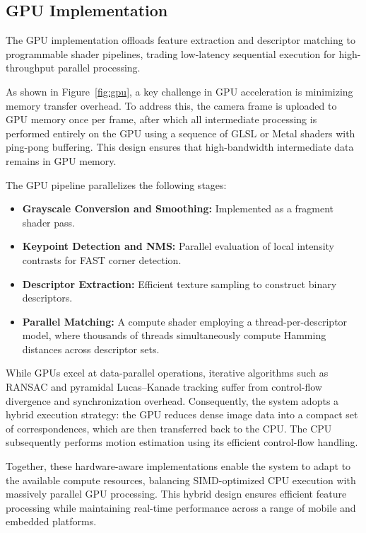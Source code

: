 \subsection{GPU Implementation}



The GPU implementation offloads feature extraction and descriptor matching to programmable shader pipelines, trading low-latency sequential execution for high-throughput parallel processing.

As shown in Figure~\ref{fig:gpu}, a key challenge in GPU acceleration is minimizing memory transfer overhead. To address this, the camera frame is uploaded to GPU memory once per frame, after which all intermediate processing is performed entirely on the GPU using a sequence of GLSL or Metal shaders with ping-pong buffering. This design ensures that high-bandwidth intermediate data remains in GPU memory.

The GPU pipeline parallelizes the following stages:

\begin{itemize}
    \item \textbf{Grayscale Conversion and Smoothing:} Implemented as a fragment shader pass.
    \item \textbf{Keypoint Detection and NMS:} Parallel evaluation of local intensity contrasts for FAST corner detection.
    \item \textbf{Descriptor Extraction:} Efficient texture sampling to construct binary descriptors.
    \item \textbf{Parallel Matching:} A compute shader employing a thread-per-descriptor model, where thousands of threads simultaneously compute Hamming distances across descriptor sets.
\end{itemize}

While GPUs excel at data-parallel operations, iterative algorithms such as RANSAC and pyramidal Lucas--Kanade tracking suffer from control-flow divergence and synchronization overhead. Consequently, the system adopts a hybrid execution strategy: the GPU reduces dense image data into a compact set of correspondences, which are then transferred back to the CPU. The CPU subsequently performs motion estimation using its efficient control-flow handling.

Together, these hardware-aware implementations enable the system to adapt to the available compute resources, balancing SIMD-optimized CPU execution with massively parallel GPU processing. This hybrid design ensures efficient feature processing while maintaining real-time performance across a range of mobile and embedded platforms.